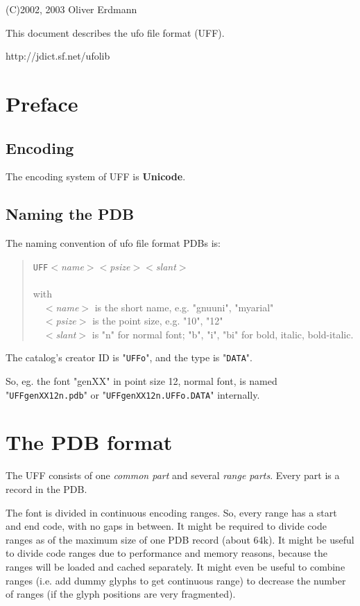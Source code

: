 \documentclass[a4paper]{article}
\begin{document}
(C)2002, 2003 Oliver Erdmann

This document describes the ufo file format (UFF).

http://jdict.sf.net/ufolib

\hrulefill

\tableofcontents

\hrulefill

\section{Preface}

\subsection{Encoding}

The encoding system of UFF is \textbf{Unicode}.

\subsection{Naming the PDB}

The naming convention of ufo file format PDBs is:
\begin{quotation}
\verb+UFF+\textit{$<$name$>$}\textit{$<$psize$>$}\textit{$<$slant$>$}\\
\ \\
with\\
\ \ \textit{$<$name$>$} is the short name, e.g. "gnuuni", "myarial"\\
\ \ \textit{$<$psize$>$} is the point size, e.g. "10", "12"\\
\ \ \textit{$<$slant$>$} is "n" for normal font; "b", "i", "bi" for bold, italic, bold-italic.
\end{quotation}

The catalog's creator ID is "\verb+UFFo+", and the type is "\verb+DATA+". 

So, eg. the font "genXX" in point size 12, normal font, is named "\verb+UFFgenXX12n.pdb+" or "\verb+UFFgenXX12n.UFFo.DATA+" internally.

\section{The PDB format}

The UFF consists of one \emph{common part} and several \emph{range parts}.
Every part is a record in the PDB.

The font is divided in continuous encoding ranges. So, every range has a start
and end code, with no gaps in between. It might be required to divide code
ranges as of the maximum size of one PDB record (about 64k). It might be
useful to divide code ranges due to performance and memory reasons, because the
ranges will be loaded and cached separately. It might even be useful to
combine ranges (i.e. add dummy glyphs to get continuous range) to decrease the
number of ranges (if the glyph positions are very fragmented).
\end{document}

